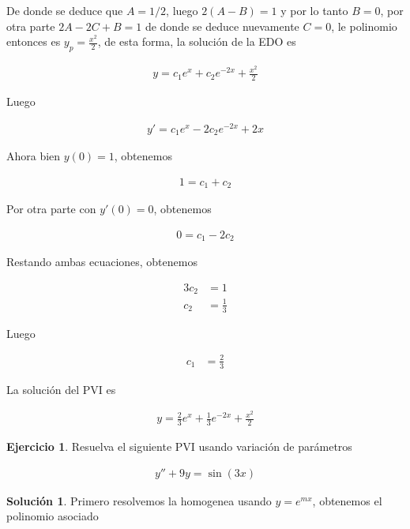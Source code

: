 \documentclass{article}
\theoremstyle{plain}
\theoremstyle{definition}
\newtheorem{ejer}[thm]{Ejercicio}
\newtheorem{sol}[thm]{Solución}
\begin{document}
De donde se deduce que $A=1/2$, luego $2(A-B)=1$ y por lo tanto $B=0$, por otra parte $2A-2C+B =1$ de donde se deduce nuevamente $C=0$, le polinomio entonces es $y_p=\frac{x^2}{2}$, de esta forma, la solución de la EDO es

\begin{align*}
    y= c_1e^x+c_2e^{-2x} +\frac{x^2}{2}
\end{align*}

Luego

\begin{align*}
    y'= c_1e^x-2c_2e^{-2x} +2x
\end{align*}

Ahora bien $y(0)=1$, obtenemos

\begin{align*}
    1= c_1+c_2
\end{align*}

Por otra parte con $y'(0)=0$, obtenemos

\begin{align*}
    0= c_1-2c_2
\end{align*}

Restando ambas ecuaciones, obtenemos

\begin{align*}
    3c_2&=1 \\
    c_2 &=\frac{1}{3}
\end{align*}

Luego

\begin{align*}
    c_1 &=\frac{2}{3}
\end{align*}

La solución del PVI es

\begin{align*}
    y= \frac{2}{3}e^x+\frac{1}{3}e^{-2x} +\frac{x^2}{2}
\end{align*}

\newpage

\begin{ejer}Resuelva el siguiente PVI usando variación de parámetros
\end{ejer}


\begin{align*}
    y''+9y=\sin(3x)
\end{align*}

\begin{sol}Primero resolvemos la homogenea usando $y=e^{mx}$, obtenemos el polinomio asociado
\end{sol}
\end{document}
